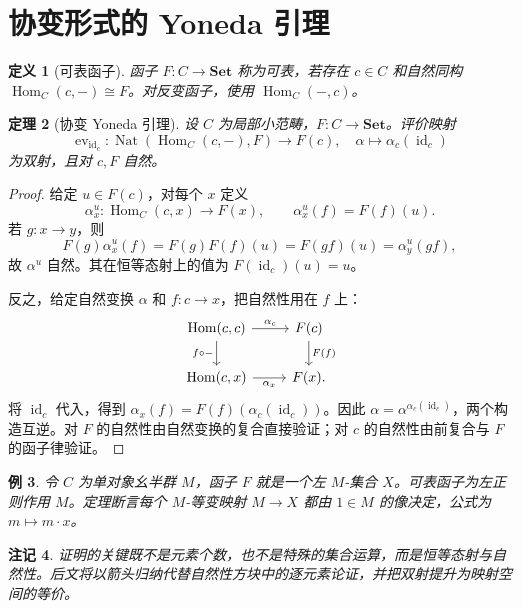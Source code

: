 \documentclass[12pt,oneside,openany,fontset=none]{ctexbook}
\theoremstyle{cn}
\newtheorem{definition}{定义}[chapter]
\newtheorem{example}[definition]{例}
\newtheorem{theorem}[definition]{定理}
\newtheorem{remark}[definition]{注记}
\numberwithin{equation}{chapter}
\newcommand{\Set}{\mathbf{Set}}
\newcommand{\id}{\operatorname{id}}
\newcommand{\Hom}{\operatorname{Hom}}
\newcommand{\Nat}{\operatorname{Nat}}
\newcommand{\ev}{\operatorname{ev}}
\begin{document}
\section{协变形式的 Yoneda 引理}
\begin{definition}[可表函子]
函子 $F:C\to\Set$ 称为可表，若存在 $c\in C$ 和自然同构 $\Hom_C(c,-)\cong F$。对反变函子，使用 $\Hom_C(-,c)$。
\end{definition}
\begin{theorem}[协变 Yoneda 引理]\label{thm:ordinary-yoneda}
设 $C$ 为局部小范畴，$F:C\to\Set$。评价映射
\[
\ev_{\id_c}:\Nat(\Hom_C(c,-),F)\longrightarrow F(c),
\quad\alpha\longmapsto\alpha_c(\id_c)
\]
为双射，且对 $c,F$ 自然。
\end{theorem}
\begin{proof}
给定 $u\in F(c)$，对每个 $x$ 定义
\[
\alpha^u_x:\Hom_C(c,x)\to F(x),
\qquad \alpha^u_x(f)=F(f)(u).
\]
若 $g:x\to y$，则
\[
F(g)\alpha^u_x(f)=F(g)F(f)(u)=F(gf)(u)=\alpha^u_y(gf),
\]
故 $\alpha^u$ 自然。其在恒等态射上的值为 $F(\id_c)(u)=u$。

反之，给定自然变换 $\alpha$ 和 $f:c\to x$，把自然性用在 $f$ 上：
\[
\begin{tikzcd}
\Hom(c,c)\ar[r,"\alpha_c"]\ar[d,"f\circ-"']&F(c)\ar[d,"F(f)"]\\
\Hom(c,x)\ar[r,"\alpha_x"']&F(x).
\end{tikzcd}
\]
将 $\id_c$ 代入，得到 $\alpha_x(f)=F(f)(\alpha_c(\id_c))$。因此 $\alpha=\alpha^{\alpha_c(\id_c)}$，两个构造互逆。对 $F$ 的自然性由自然变换的复合直接验证；对 $c$ 的自然性由前复合与 $F$ 的函子律验证。
\end{proof}
\begin{example}
令 $C$ 为单对象幺半群 $M$，函子 $F$ 就是一个左 $M$-集合 $X$。可表函子为左正则作用 $M$。定理断言每个 $M$-等变映射 $M\to X$ 都由 $1\in M$ 的像决定，公式为 $m\mapsto m\cdot x$。
\end{example}
\begin{remark}
证明的关键既不是元素个数，也不是特殊的集合运算，而是恒等态射与自然性。后文将以箭头归纳代替自然性方块中的逐元素论证，并把双射提升为映射空间的等价。
\end{remark}
\end{document}
